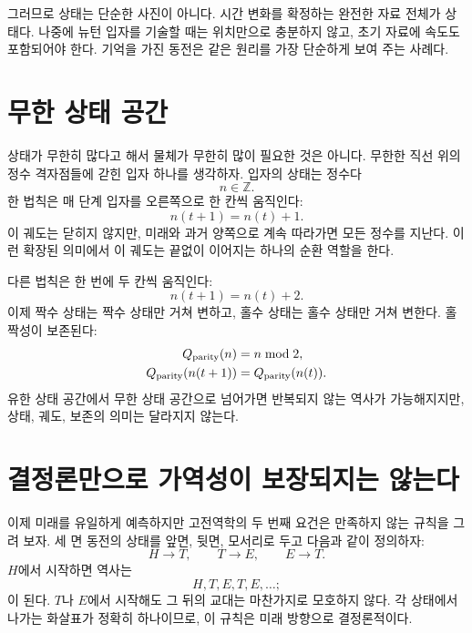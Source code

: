 그러므로 상태는 단순한 사진이 아니다. 시간 변화를 확정하는 완전한 자료 전체가 상태다. 나중에 뉴턴 입자를 기술할 때는 위치만으로 충분하지 않고, 초기 자료에 속도도 포함되어야 한다. 기억을 가진 동전은 같은 원리를 가장 단순하게 보여 주는 사례다.

\section{무한 상태 공간}

상태가 무한히 많다고 해서 물체가 무한히 많이 필요한 것은 아니다. 무한한 직선 위의 정수 격자점들에 갇힌 입자 하나를 생각하자. 입자의 상태는 정수다
\[
  n\in\mathbb Z.
\]
한 법칙은 매 단계 입자를 오른쪽으로 한 칸씩 움직인다:
\begin{equation}
  n(t+1)=n(t)+1.
  \label{eq:lattice-one}
\end{equation}
이 궤도는 닫히지 않지만, 미래와 과거 양쪽으로 계속 따라가면 모든 정수를 지난다. 이런 확장된 의미에서 이 궤도는 끝없이 이어지는 하나의 순환 역할을 한다.

다른 법칙은 한 번에 두 칸씩 움직인다:
\begin{equation}
  n(t+1)=n(t)+2.
  \label{eq:lattice-two}
\end{equation}
이제 짝수 상태는 짝수 상태만 거쳐 변하고, 홀수 상태는 홀수 상태만 거쳐 변한다. 홀짝성이 보존된다:
\begin{equation}
  \begin{aligned}
    Q_{\rm parity}(n)&=n\bmod 2,\\
    Q_{\rm parity}(n(t+1))&=Q_{\rm parity}(n(t)).
  \end{aligned}
\end{equation}
유한 상태 공간에서 무한 상태 공간으로 넘어가면 반복되지 않는 역사가 가능해지지만, 상태, 궤도, 보존의 의미는 달라지지 않는다.

\section{결정론만으로 가역성이 보장되지는 않는다}

이제 미래를 유일하게 예측하지만 고전역학의 두 번째 요건은 만족하지 않는 규칙을 그려 보자. 세 면 동전의 상태를 앞면, 뒷면, 모서리로 두고 다음과 같이 정의하자:
\begin{equation}
  H\to T,
  \qquad
  T\to E,
  \qquad
  E\to T.
  \label{eq:nonreversible-map}
\end{equation}
\(H\)에서 시작하면 역사는
\[
  H,T,E,T,E,\ldots;
\]
이 된다. \(T\)나 \(E\)에서 시작해도 그 뒤의 교대는 마찬가지로 모호하지 않다. 각 상태에서 나가는 화살표가 정확히 하나이므로, 이 규칙은 미래 방향으로 결정론적이다.

